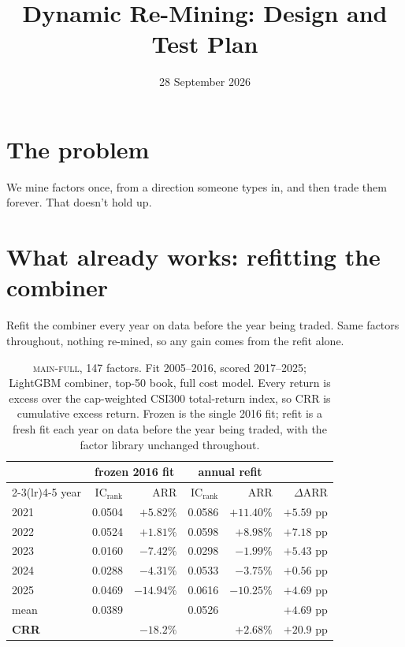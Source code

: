 \documentclass[11pt]{article}
\title{\vspace{-2.5em}\textbf{Dynamic Re-Mining: Design and Test Plan}}
\date{28 September 2026}
\newcommand{\main}{\textsc{main-full}}
\newcommand{\rid}{\mathrm{IC}_{\mathrm{rank}}}
\begin{document}
\maketitle
\vspace{-2em}

\section{The problem}

We mine factors once, from a direction someone types in, and then trade them
forever. That doesn't hold up.

\section{What already works: refitting the combiner}

Refit the combiner every year on data before the year being traded. Same factors
throughout, nothing re-mined, so any gain comes from the refit alone.

\begin{table}[h]
\centering
\caption{\main{}, 147 factors. Fit 2005--2016, scored 2017--2025; LightGBM
combiner, top-50 book, full cost model. Every return is excess over the
cap-weighted CSI300 total-return index, so CRR is cumulative excess return.
Frozen is the single 2016 fit; refit is a fresh fit each year on data before the
year being traded, with the factor library unchanged throughout.}
\begin{tabular}{lrrrrr}
\toprule
& \multicolumn{2}{c}{frozen 2016 fit} & \multicolumn{2}{c}{annual refit} & \\
\cmidrule(lr){2-3}\cmidrule(lr){4-5}
year & $\rid$ & ARR & $\rid$ & ARR & $\Delta$ARR \\
\midrule
2021 & 0.0504 & $+5.82\%$  & 0.0586 & $+11.40\%$ & $+5.59$ pp \\
2022 & 0.0524 & $+1.81\%$  & 0.0598 & $+8.98\%$  & $+7.18$ pp \\
2023 & 0.0160 & $-7.42\%$  & 0.0298 & $-1.99\%$  & $+5.43$ pp \\
2024 & 0.0288 & $-4.31\%$  & 0.0533 & $-3.75\%$  & $+0.56$ pp \\
2025 & 0.0469 & $-14.94\%$ & 0.0616 & $-10.25\%$ & $+4.69$ pp \\
\midrule
mean & 0.0389 & & 0.0526 & & $+4.69$ pp \\
\textbf{CRR} & & $\bm{-18.2\%}$ & & $\bm{+2.68\%}$ & $+20.9$ pp \\
\bottomrule
\end{tabular}
\end{table}
\end{document}
